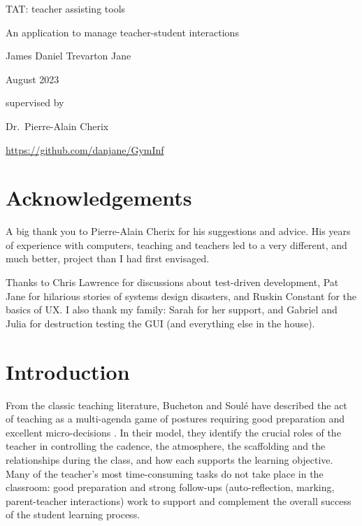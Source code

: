 \documentclass[10pt]{article}
\begin{document}
\begin{titlepage}
\large

\centering

{\Huge TAT: teacher assisting tools}

\vspace{5mm}

{\Large An application to manage teacher-student interactions}

\vfill
{\Large James Daniel Trevarton Jane}

\vspace{5mm}

August 2023

\vfill
supervised by

Dr.~Pierre-Alain Cherix
\vfill


\url{https://github.com/danjane/GymInf}



\end{titlepage}

\tableofcontents

\section*{Acknowledgements}

A big thank you to Pierre-Alain Cherix for his suggestions and advice. His years of experience with computers, teaching and teachers led to a very different, and much better, project than I had first envisaged.

Thanks to Chris Lawrence for discussions about test-driven development, Pat Jane for hilarious stories of systems design disasters, and Ruskin Constant for the basics of UX. I also thank my family: Sarah for her support, and Gabriel and Julia for destruction testing the GUI (and everything else in the house). 

\newpage
\section{Introduction}

From the classic teaching literature, Bucheton and Soulé have described the act of teaching as a multi-agenda game of postures requiring good preparation and excellent micro-decisions \cite{BS09}. In their model, they identify the crucial roles of the teacher in controlling the cadence, the atmosphere, the scaffolding and the relationships during the class, and how each supports the learning objective. Many of the teacher's most time-consuming tasks do not take place in the classroom: good preparation and strong follow-ups (auto-reflection, marking, parent-teacher interactions) work to support and complement the overall success of the student learning process.
\end{document}
